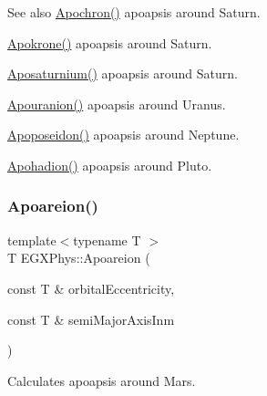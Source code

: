 \begin{DoxySeeAlso}{See also}
\mbox{\hyperlink{group___e_g_x_phys-_apoapsis_gac978de20a08121198f73637018c80eee}{Apochron()}} apoapsis around Saturn. 

\mbox{\hyperlink{group___e_g_x_phys-_apoapsis_ga572bf783c39ce472a06e89063f1fd1a7}{Apokrone()}} apoapsis around Saturn. 

\mbox{\hyperlink{group___e_g_x_phys-_apoapsis_gabb69067baa611c8bda701d7040cc47b6}{Aposaturnium()}} apoapsis around Saturn. 

\mbox{\hyperlink{group___e_g_x_phys-_apoapsis_gae6f96c6d840188839132e0ef94ce0711}{Apouranion()}} apoapsis around Uranus. 

\mbox{\hyperlink{group___e_g_x_phys-_apoapsis_ga985afde0717360cffc6b5c17c9a42ac8}{Apoposeidon()}} apoapsis around Neptune. 

\mbox{\hyperlink{group___e_g_x_phys-_apoapsis_ga9e2578ab880b46f0736936608710f4ad}{Apohadion()}} apoapsis around Pluto. 
\end{DoxySeeAlso}
\mbox{\label{group___e_g_x_phys-_apoapsis_ga8a44d21df90f3e6e9168b871a5b7f26b}} 
\subsubsection{\texorpdfstring{Apoareion()}{Apoareion()}}
{\footnotesize\ttfamily template$<$typename T $>$ \\
T E\+G\+X\+Phys\+::\+Apoareion (\begin{DoxyParamCaption}\item[{const T \&}]{orbital\+Eccentricity,  }\item[{const T \&}]{semi\+Major\+Axis\+Inm }\end{DoxyParamCaption})}



Calculates apoapsis around Mars. 


